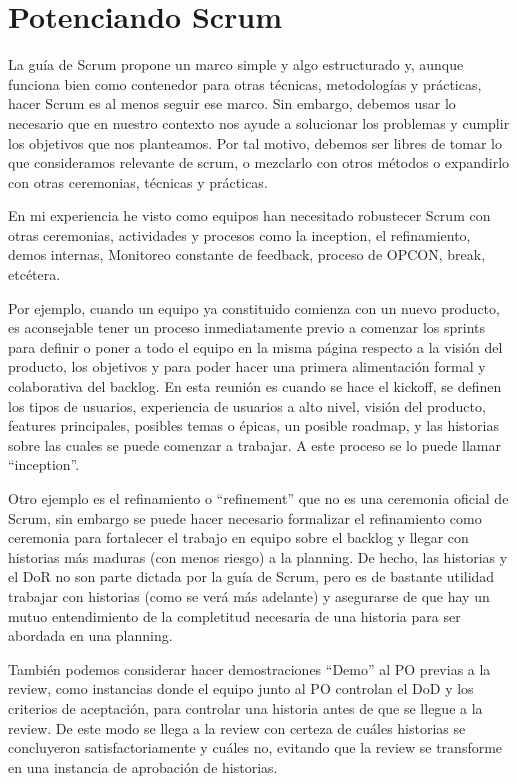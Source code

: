 \newpage
\section{Potenciando Scrum}

La guía de Scrum propone un marco simple y algo estructurado y, aunque funciona bien como contenedor para otras técnicas, metodologías y prácticas, hacer Scrum es al menos seguir ese marco. Sin embargo, debemos usar lo necesario que en nuestro contexto nos ayude a solucionar los problemas y cumplir los objetivos que nos planteamos. Por tal motivo, debemos ser libres de tomar lo que consideramos relevante de scrum, o mezclarlo con otros métodos o expandirlo con otras ceremonias, técnicas y prácticas.

En mi experiencia he visto como equipos han necesitado robustecer Scrum con otras ceremonias, actividades y procesos como la inception, el refinamiento, demos internas, Monitoreo constante de feedback, proceso de OPCON, break, etcétera. 

Por ejemplo, cuando un equipo ya constituido comienza con un nuevo producto, es aconsejable tener un proceso inmediatamente previo a comenzar los sprints para definir o poner a todo el equipo en la misma página respecto a la visión del producto, los objetivos y para poder hacer una primera alimentación formal y colaborativa del backlog. En esta reunión es cuando se hace el kickoff, se definen los tipos de usuarios, experiencia de usuarios a alto nivel, visión del producto, features principales, posibles temas o épicas, un posible roadmap, y las historias sobre las cuales se puede comenzar a trabajar. A este proceso se lo puede llamar “inception”.

Otro ejemplo es el refinamiento o “refinement” que no es una ceremonia oficial de Scrum, sin embargo se puede hacer necesario formalizar el refinamiento como ceremonia para fortalecer el trabajo en equipo sobre el backlog y llegar con historias más maduras (con menos riesgo) a la planning. De hecho, las historias y el DoR no son parte dictada por la guía de Scrum, pero es de bastante utilidad trabajar con historias (como se verá más adelante) y asegurarse de que hay un mutuo entendimiento de la completitud necesaria de una historia para ser abordada en una planning.

También podemos considerar hacer demostraciones “Demo” al PO previas a la review, como instancias donde el equipo junto al PO controlan el DoD y los criterios de aceptación, para controlar una historia antes de que se llegue a la review. De este modo se llega a la review con certeza de cuáles historias se concluyeron satisfactoriamente y cuáles no, evitando que la review se transforme en una instancia de aprobación de historias.

